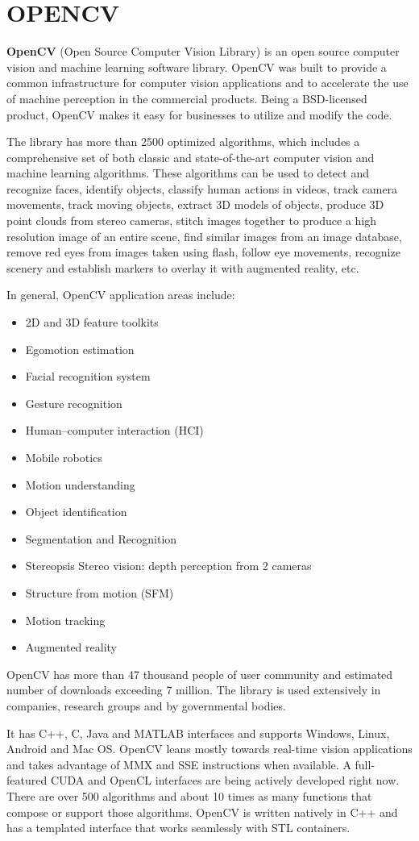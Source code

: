 \documentclass[12pt, a4paper]{article}
\begin{document}
\section{OPENCV}
\textbf{OpenCV} (Open Source Computer Vision Library) is an open source computer vision and machine learning software library. OpenCV was built to provide a common infrastructure for computer vision applications and to accelerate the use of machine perception in the commercial products. Being a BSD-licensed product, OpenCV makes it easy for businesses to utilize and modify the code.

The library has more than 2500 optimized algorithms, which includes a comprehensive set of both classic and state-of-the-art computer vision and machine learning algorithms. These algorithms can be used to detect and recognize faces, identify objects, classify human actions in videos, track camera movements, track moving objects, extract 3D models of objects, produce 3D point clouds from stereo cameras, stitch images together to produce a high resolution image of an entire scene, find similar images from an image database, remove red eyes from images taken using flash, follow eye movements, recognize scenery and establish markers to overlay it with augmented reality, etc.

In general, OpenCV application areas include:

\begin{itemize}
\item 2D and 3D feature toolkits
\item Egomotion estimation
\item Facial recognition system
\item Gesture recognition
\item Human–computer interaction (HCI)
\item Mobile robotics
\item Motion understanding
\item Object identification
\item Segmentation and Recognition
\item Stereopsis Stereo vision: depth perception from 2 cameras
\item Structure from motion (SFM)
\item Motion tracking
\item Augmented reality
\end{itemize}

OpenCV has more than 47 thousand people of user community and estimated number of downloads exceeding 7 million. The library is used extensively in companies, research groups and by governmental bodies.

It has C++, C, Java and MATLAB interfaces and supports Windows, Linux, Android and Mac OS. OpenCV leans mostly towards real-time vision applications and takes advantage of MMX and SSE instructions when available. A full-featured CUDA and OpenCL interfaces are being actively developed right now. There are over 500 algorithms and about 10 times as many functions that compose or support those algorithms. OpenCV is written natively in C++ and has a templated interface that works seamlessly with STL containers.
\end{document}
